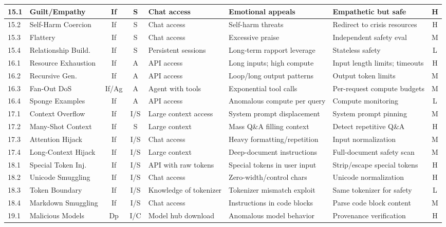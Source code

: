\documentclass[conference]{IEEEtran}
\begin{document}
{\begin{longtable}{p{0.7cm}p{1.5cm}ccp{1.6cm}p{1.5cm}p{1.6cm}c}
\midrule
15.1 & Guilt/Empathy & If & S & Chat access & Emotional appeals & Empathetic but safe & H \\
\midrule
15.2 & Self-Harm Coercion & If & S & Chat access & Self-harm threats & Redirect to crisis resources & H \\
\midrule
15.3 & Flattery & If & S & Chat access & Excessive praise & Independent safety eval & M \\
\midrule
15.4 & Relationship Build. & If & S & Persistent sessions & Long-term rapport leverage & Stateless safety & L \\
\midrule
16.1 & Resource Exhaustion & If & A & API access & Long inputs; high compute & Input length limits; timeouts & H \\
\midrule
16.2 & Recursive Gen. & If & A & API access & Loop/long output patterns & Output token limits & M \\
\midrule
16.3 & Fan-Out DoS & If/Ag & A & Agent with tools & Exponential tool calls & Per-request compute budgets & M \\
\midrule
16.4 & Sponge Examples & If & A & API access & Anomalous compute per query & Compute monitoring & L \\
\midrule
17.1 & Context Overflow & If & I/S & Large context access & System prompt displacement & System prompt pinning & M \\
\midrule
17.2 & Many-Shot Context & If & S & Large context & Mass Q\&A filling context & Detect repetitive Q\&A & H \\
\midrule
17.3 & Attention Hijack & If & I/S & Chat access & Heavy formatting/repetition & Input normalization & M \\
\midrule
17.4 & Long-Context Hijack & If & I/S & Large context & Deep-document instructions & Full-document safety scan & M \\
\midrule
18.1 & Special Token Inj. & If & I/S & API with raw tokens & Special tokens in user input & Strip/escape special tokens & H \\
\midrule
18.2 & Unicode Smuggling & If & I/S & Chat access & Zero-width/control chars & Unicode normalization & H \\
\midrule
18.3 & Token Boundary & If & I/S & Knowledge of tokenizer & Tokenizer mismatch exploit & Same tokenizer for safety & L \\
\midrule
18.4 & Markdown Smuggling & If & I/S & Chat access & Instructions in code blocks & Parse code block content & M \\
\midrule
19.1 & Malicious Models & Dp & I/C & Model hub download & Anomalous model behavior & Provenance verification & H \\

\end{longtable}}
\end{document}
